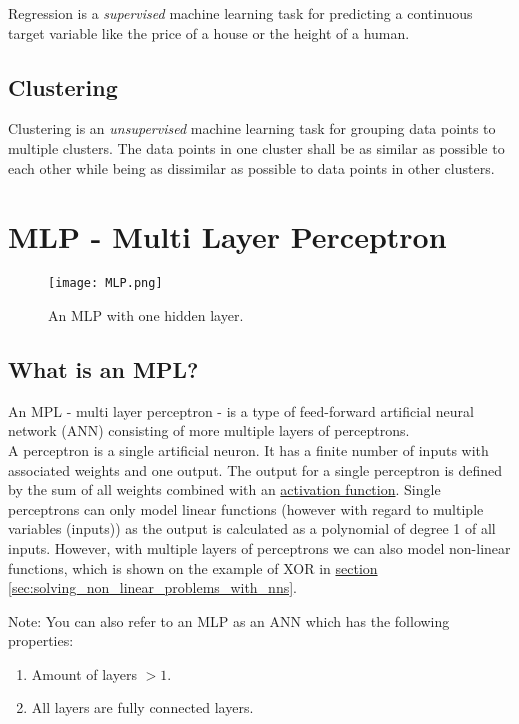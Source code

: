 Regression is a \textit{supervised} machine learning task for predicting a continuous target variable like the price of a house or the height of a human.

\subsection{Clustering}

Clustering is an \textit{unsupervised} machine learning task for grouping data points to multiple clusters. The data points in one cluster shall be as similar as possible to each other while being as dissimilar as possible to data points in other clusters.

\section{MLP - Multi Layer Perceptron}
\label{sec:mlp}

\begin{figure}[h]
    \centering
    \texttt{[image: MLP.png]}
    \caption{An MLP with one hidden layer.}
    \label{fig:mlp}
\end{figure}

\subsection{What is an MPL?}

An MPL - multi layer perceptron - is a type of feed-forward artificial neural network (ANN) consisting of more multiple layers of perceptrons.\\
A perceptron is a single artificial neuron. It has a finite number of inputs with associated weights and one output. The output for a single perceptron is defined by the sum of all weights combined with an \hyperref[sec:activation_functions]{activation function}. Single perceptrons can only model linear functions (however with regard to multiple variables (inputs)) as the output is calculated as a polynomial of degree 1 of all inputs. However, with multiple layers of perceptrons we can also model non-linear functions, which is shown on the example of XOR in \hyperref[sec:solving_non_linear_problems_with_nns]{section \ref*{sec:solving_non_linear_problems_with_nns}}.

Note: You can also refer to an MLP as an ANN which has the following properties:
\begin{enumerate}
    \item Amount of layers $> 1$.
    \item All layers are fully connected layers.
\end{enumerate}

